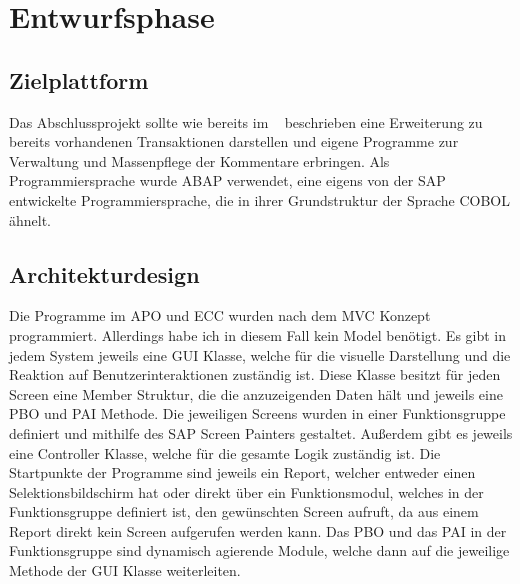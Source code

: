 \section{Entwurfsphase} 
\label{sec:Entwurfsphase}

\subsection{Zielplattform}
\label{sec:Zielplattform}
Das Abschlussprojekt sollte wie bereits im ~ beschrieben eine Erweiterung zu bereits vorhandenen Transaktionen darstellen und eigene Programme zur Verwaltung und Massenpflege der Kommentare erbringen. Als Programmiersprache wurde \ac{ABAP} verwendet, eine eigens von der SAP entwickelte Programmiersprache, die in ihrer Grundstruktur der Sprache COBOL ähnelt.

\subsection{Architekturdesign}
\label{sec:Architekturdesign}
Die Programme im \ac{APO} und \ac{ECC} wurden nach dem \ac{MVC} Konzept programmiert. Allerdings habe ich in diesem Fall kein Model benötigt. Es gibt in jedem System jeweils eine \ac{GUI} Klasse, welche für die visuelle Darstellung und die Reaktion auf Benutzerinteraktionen zuständig ist. Diese Klasse besitzt für jeden Screen eine Member Struktur, die die anzuzeigenden Daten hält und jeweils eine \ac{PBO} und \ac{PAI} Methode. Die jeweiligen Screens wurden in einer Funktionsgruppe definiert und mithilfe des SAP Screen Painters gestaltet. Außerdem gibt es jeweils eine Controller Klasse, welche für die gesamte Logik zuständig ist. Die Startpunkte der Programme sind jeweils ein Report, welcher entweder einen Selektionsbildschirm hat oder direkt über ein Funktionsmodul, welches in der Funktionsgruppe definiert ist, den gewünschten Screen aufruft, da aus einem Report direkt kein Screen aufgerufen werden kann. Das \ac{PBO} und das \ac{PAI} in der Funktionsgruppe sind dynamisch agierende Module, welche dann auf die jeweilige Methode der \ac{GUI} Klasse weiterleiten.

